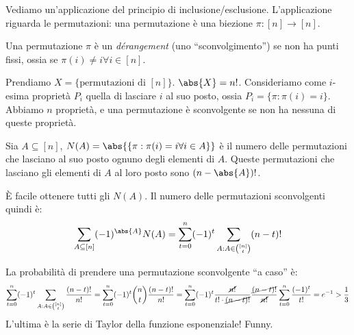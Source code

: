 Vediamo un'applicazione del principio di inclusione/esclusione.
L'applicazione riguarda le permutazioni: una permutazione \`e una biezione $\pi : [n] \to [n]$.
\begin{defn}
	Una permutazione $\pi$ \`e un \emph{d\'erangement} (uno ``sconvolgimento'') se non ha punti fissi, ossia se $\pi(i) \neq i \forall i \in [n]$.
\end{defn}
Prendiamo $X = \{ \text{permutazioni di } [n]\}$.
$\abs{X} = n!$.
Consideriamo come $i$-esima propriet\`a $P_i$ quella di lasciare $i$ al suo posto, ossia $P_i = \{ \pi : \pi(i) = i \}$.
Abbiamo $n$ propriet\`a, e una permutazione \`e sconvolgente se non ha nessuna di queste propriet\`a.

Sia $A \subseteq [n]$, $N(A) = \abs{\{ \pi : \pi(i) = i \forall i \in A \}}$ \`e il numero delle permutazioni che lasciano al suo posto ognuno degli elementi di $A$.
Queste permutazioni che lasciano gli elementi di $A$ al loro posto sono $(n - \abs{A})!$.

\`E facile ottenere tutti gli $N(A)$.
Il numero delle permutazioni sconvolgenti quindi \`e:
\[
	\sum_{A \subseteq [n]} (-1)^{\abs{A}} N(A) =
	\sum_{t = 0}^{n} (-1)^{t} \sum_{A : A \in \binom{[n]}{t}} (n - t)!
\]

La probabilit\`a di prendere una permutazione sconvolgente ``a caso'' \`e:
\[
	\sum_{t = 0}^{n} (-1)^{t} \sum_{A : A \in \binom{[n]}{t}} \frac{(n - t)!}{n!} =
	\sum_{t = 0}^{n} (-1)^{t} \binom{n}{t} \frac{(n-t)!}{n!} =
	\sum_{t = 0}^{n} (-1)^{t} \frac{\cancel{n!}}{t! \cdot \cancel{(n-t)!}} \frac{\cancel{(n-t)!}}{\cancel{n!}}
	\sum_{t = 0}^{n} \frac{(-1)^{t}}{t!} = e^{-1} > \frac{1}{3}
\]
L'ultima \`e la serie di Taylor della funzione esponenziale!
Funny.








